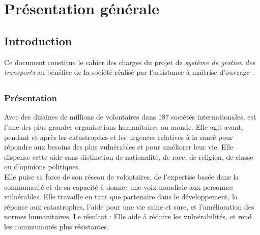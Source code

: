 \chapter{Présentation générale}

\section{Introduction}
Ce document constitue le cahier des charges du projet de \emph{système de gestion des transports} au bénéfice de la société \mo réalisé par l'assistance à maîtrise d'ouvrage \amo.

\section{\mo}

\subsection{Présentation}
Avec des dizaines de millions de volontaires dans 187 sociétés internationales, \mo est l'une des plus grandes organisations humanitaires au monde.
Elle agit avant, pendant et après les catastrophes et les urgences relatives à la santé pour répondre aux besoins des plus vulnérables et pour améliorer leur vie.
Elle dispense cette aide sans distinction de nationalité, de race, de religion, de classe ou d'opinions politiques.
\\
Elle puise sa force de son réseau de volontaires, de l'expertise basée dans la communauté et de sa capacité à donner une voix mondiale aux personnes vulnérables. Elle travaille en tant que partenaire dans le développement, la réponse aux catastrophes, l'aide pour une vie saine et sure, et l'amélioration des normes humanitaires. Le résultat : Elle aide à réduire les vulnérabilités, et rend les communautés plus résistantes.

